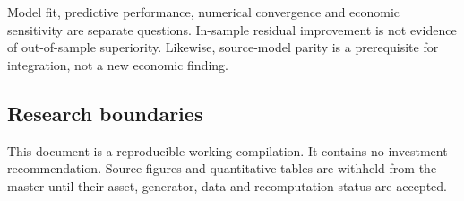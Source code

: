 Model fit, predictive performance, numerical convergence and economic sensitivity are separate questions. In-sample residual improvement is not evidence of out-of-sample superiority. Likewise, source-model parity is a prerequisite for integration, not a new economic finding.

\subsection{Research boundaries}

This document is a reproducible working compilation. It contains no investment recommendation. Source figures and quantitative tables are withheld from the master until their asset, generator, data and recomputation status are accepted.
